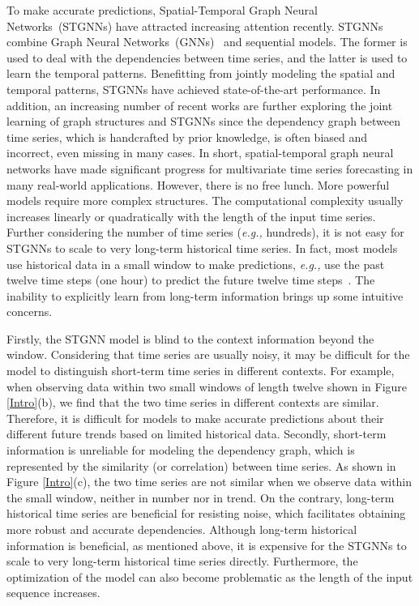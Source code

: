 \documentclass[sigconf]{acmart}
\newcommand{\eg}{\textit{e.g.,}\xspace}
\begin{document}
To make accurate predictions, Spatial-Temporal Graph Neural Networks~(STGNNs) have attracted increasing attention recently.
STGNNs combine Graph Neural Networks~(GNNs)~\cite{2017GCN} and sequential models.
The former is used to deal with the dependencies between time series, and the latter is used to learn the temporal patterns.
Benefitting from jointly modeling the spatial and temporal patterns, STGNNs have achieved state-of-the-art performance.
In addition, an increasing number of recent works are further exploring the joint learning of graph structures and STGNNs since the dependency graph between time series, which is handcrafted by prior knowledge, is often biased and incorrect, even missing in many cases.
In short, spatial-temporal graph neural networks have made significant progress for multivariate time series forecasting in many real-world applications.
However, there is no free lunch.
More powerful models require more complex structures.
The computational complexity usually increases linearly or quadratically with the length of the input time series.
Further considering the number of time series (\eg hundreds), it is not easy for STGNNs to scale to very long-term historical time series.
In fact, most models use historical data in a small window to make predictions, \eg use the past twelve time steps (one hour) to predict the future twelve time steps~\cite{2020MTGNN, 2021GTS, 2020GMAN, 2017DCRNN, GWNet}.
The inability to explicitly learn from long-term information brings up some intuitive concerns.

Firstly, the STGNN model is blind to the context information beyond the window.
Considering that time series are usually noisy, it may be difficult for the model to distinguish short-term time series in different contexts.
For example, when observing data within two small windows of length twelve shown in Figure \ref{Intro}(b), we find that the two time series in different contexts are similar.
Therefore, it is difficult for models to make accurate predictions about their different future trends based on limited historical data.
Secondly, short-term information is unreliable for modeling the dependency graph, which is represented by the similarity (or correlation) between time series.
As shown in Figure \ref{Intro}(c), the two time series are not similar when we observe data within the small window, neither in number nor in trend.
On the contrary, long-term historical time series are beneficial for resisting noise, which facilitates obtaining more robust and accurate dependencies.
Although long-term historical information is beneficial, as mentioned above, it is expensive for the STGNNs to scale to very long-term historical time series directly.
Furthermore, the optimization of the model can also become problematic as the length of the input sequence increases.
\end{document}
